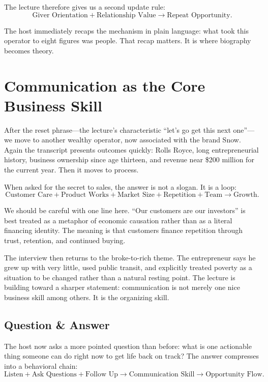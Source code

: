 The lecture therefore gives us a second update rule:
\begin{equation}
\text{Giver Orientation}+\text{Relationship Value} \to \text{Repeat Opportunity}.
\end{equation}

The host immediately recaps the mechanism in plain language: what took this operator to eight figures was people. That recap matters. It is where biography becomes theory.

\section{Communication as the Core Business Skill}

After the reset phrase---the lecture's characteristic ``let's go get this next one''---we move to another wealthy operator, now associated with the brand Snow. Again the transcript presents outcomes quickly: Rolls Royce, long entrepreneurial history, business ownership since age thirteen, and revenue near \$200 million for the current year. Then it moves to process.

When asked for the secret to sales, the answer is not a slogan. It is a loop:
\begin{equation}
\text{Customer Care}+\text{Product Works}+\text{Market Size}+\text{Repetition}+\text{Team} \to \text{Growth}.
\end{equation}

We should be careful with one line here. ``Our customers are our investors'' is best treated as a metaphor of economic causation rather than as a literal financing identity. The meaning is that customers finance repetition through trust, retention, and continued buying.

The interview then returns to the broke-to-rich theme. The entrepreneur says he grew up with very little, used public transit, and explicitly treated poverty as a situation to be changed rather than a natural resting point. The lecture is building toward a sharper statement: communication is not merely one nice business skill among others. It is the organizing skill.

\subsection{Question \& Answer}

The host now asks a more pointed question than before: what is one actionable thing someone can do right now to get life back on track? The answer compresses into a behavioral chain:
\begin{equation}
\text{Listen}+\text{Ask Questions}+\text{Follow Up}
\to
\text{Communication Skill}
\to
\text{Opportunity Flow}.
\end{equation}

